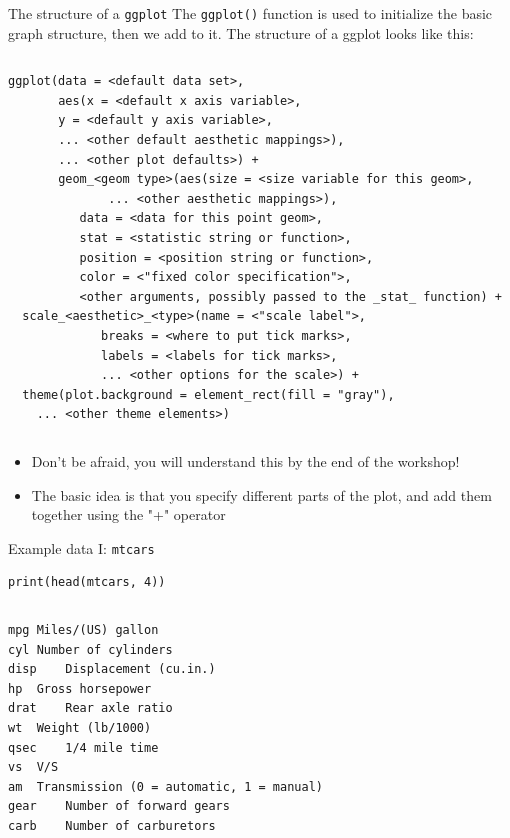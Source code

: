 \documentclass[table,smaller]{beamer}
\begin{document}
\begin{frame}[fragile,label=sec-1-5]{The structure of a \texttt{ggplot}}
 The  \texttt{ggplot()} function is used to initialize the basic graph structure, then we add to it. The structure of a ggplot looks like this:
\begin{columns} 
\begin{verbatim}
ggplot(data = <default data set>, 
       aes(x = <default x axis variable>,
	   y = <default y axis variable>,
	   ... <other default aesthetic mappings>),
       ... <other plot defaults>) +
       geom_<geom type>(aes(size = <size variable for this geom>, 
		      ... <other aesthetic mappings>),
		  data = <data for this point geom>,
		  stat = <statistic string or function>,
		  position = <position string or function>,
		  color = <"fixed color specification">,
		  <other arguments, possibly passed to the _stat_ function) +
  scale_<aesthetic>_<type>(name = <"scale label">,
		     breaks = <where to put tick marks>,
		     labels = <labels for tick marks>,
		     ... <other options for the scale>) +
  theme(plot.background = element_rect(fill = "gray"),
	... <other theme elements>)
\end{verbatim}
\vspace{-2em}
\end{columns}
\begin{itemize}
\item Don't be afraid, you will understand this by the end of the workshop!
\item The basic idea is that you specify different parts of the plot, and add them together using the "+" operator
\end{itemize}
\end{frame}

\begin{frame}[fragile,label=sec-1-6]{Example data I: \texttt{mtcars}}
 \tiny

\begin{verbatim}
print(head(mtcars, 4))
\end{verbatim}
\vspace{-2em}

\vspace{-.5em}
\begin{columns}
\begin{block}{}
\begin{verbatim}
mpg	Miles/(US) gallon			 
cyl	Number of cylinders			 
disp	Displacement (cu.in.)			 
hp	Gross horsepower			 
drat	Rear axle ratio				 
wt	Weight (lb/1000)			 
qsec	1/4 mile time				 
vs	V/S					 
am	Transmission (0 = automatic, 1 = manual) 
gear	Number of forward gears			 
carb	Number of carburetors
\end{verbatim}
\end{block}
\end{columns}
\vspace{.5em}

\normalsize
\end{frame}
\end{document}
